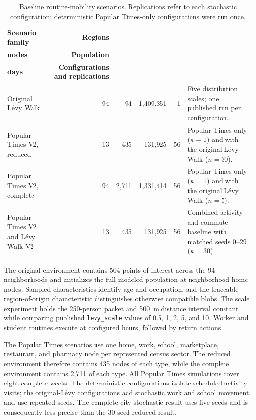 \begin{table}[ht]
\centering
\footnotesize
\caption{Baseline routine-mobility scenarios. Replications refer to each stochastic configuration; deterministic Popular Times-only configurations were run once.}
\label{tbl:routine_mobility_scenarios}
\begin{tabularx}{\linewidth}{@{}lrrrrX@{}}
\toprule
\textbf{Scenario family} &
\textbf{Regions} &
\shortstack{\textbf{Home}\\\textbf{nodes}} &
\textbf{Population} &
\shortstack{\textbf{Simulated}\\\textbf{days}} &
\textbf{Configurations and replications} \\
\midrule
Original L\'evy Walk
    & 94 & 94 & 1,409,351 & 1
    & Five distribution scales; one published run per configuration. \\
Popular Times V2, reduced
    & 13 & 435 & 131,925 & 56
    & Popular Times only ($n=1$) and with the original L\'evy Walk ($n=30$). \\
Popular Times V2, complete
    & 94 & 2,711 & 1,331,414 & 56
    & Popular Times only ($n=1$) and with the original L\'evy Walk ($n=5$). \\
Popular Times V2 and L\'evy Walk V2
    & 13 & 435 & 131,925 & 56
    & Combined activity and commute baseline with matched seeds 0--29 ($n=30$). \\
\bottomrule
\end{tabularx}
\end{table}

The original environment contains 504 points of interest across the 94 neighborhoods and initializes the full modeled population at neighborhood home nodes. Sampled characteristics identify age and occupation, and the traceable region-of-origin characteristic distinguishes otherwise compatible blobs. The scale experiment holds the 250-person packet and 500~m distance interval constant while comparing published \texttt{levy\_scale} values of 0.5, 1, 2, 5, and 10. Worker and student routines execute at configured hours, followed by return actions.

The Popular Times scenarios use one home, work, school, marketplace, restaurant, and pharmacy node per represented census sector. The reduced environment therefore contains 435 nodes of each type, while the complete environment contains 2,711 of each type. All Popular Times simulations cover eight complete weeks. The deterministic configurations isolate scheduled activity visits; the original-L\'evy configurations add stochastic work and school movement and use repeated seeds. The complete-city stochastic result uses five seeds and is consequently less precise than the 30-seed reduced result.

